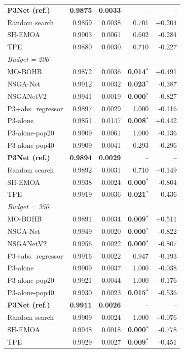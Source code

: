 \begin{table}[t]
\begin{tabular}{@{}lrrrr@{}}
        \textbf{P3Net (ref.)} & \textbf{0.9875} & \textbf{0.0033} & -- & -- \\
        Random search & 0.9859 & 0.0038 & 0.701 & +0.204 \\
        SH-EMOA & 0.9903 & 0.0061 & 0.602 & -0.284 \\
        TPE & 0.9880 & 0.0030 & 0.710 & -0.227 \\
        \midrule
        \multicolumn{5}{l}{\emph{Budget = 200}} \\
        MO-BOHB & 0.9872 & 0.0036 & \textbf{0.014$^{*}$} & +0.491 \\
        NSGA-Net & 0.9912 & 0.0032 & \textbf{0.023$^{*}$} & -0.387 \\
        NSGANetV2 & 0.9941 & 0.0019 & \textbf{0.000$^{*}$} & -0.827 \\
        P3+abs.\ regressor & 0.9897 & 0.0029 & 1.000 & -0.116 \\
        P3-alone & 0.9851 & 0.0147 & \textbf{0.008$^{*}$} & +0.442 \\
        P3-alone-pop20 & 0.9909 & 0.0061 & 1.000 & -0.136 \\
        P3-alone-pop40 & 0.9909 & 0.0041 & 0.293 & -0.296 \\
        \textbf{P3Net (ref.)} & \textbf{0.9894} & \textbf{0.0029} & -- & -- \\
        Random search & 0.9892 & 0.0031 & 0.710 & +0.149 \\
        SH-EMOA & 0.9938 & 0.0024 & \textbf{0.000$^{*}$} & -0.804 \\
        TPE & 0.9919 & 0.0036 & \textbf{0.021$^{*}$} & -0.436 \\
        \midrule
        \multicolumn{5}{l}{\emph{Budget = 350}} \\
        MO-BOHB & 0.9891 & 0.0034 & \textbf{0.009$^{*}$} & +0.511 \\
        NSGA-Net & 0.9949 & 0.0020 & \textbf{0.000$^{*}$} & -0.822 \\
        NSGANetV2 & 0.9956 & 0.0022 & \textbf{0.000$^{*}$} & -0.807 \\
        P3+abs.\ regressor & 0.9916 & 0.0022 & 0.947 & -0.193 \\
        P3-alone & 0.9909 & 0.0037 & 1.000 & -0.038 \\
        P3-alone-pop20 & 0.9921 & 0.0044 & 1.000 & -0.176 \\
        P3-alone-pop40 & 0.9930 & 0.0023 & \textbf{0.015$^{*}$} & -0.536 \\
        \textbf{P3Net (ref.)} & \textbf{0.9911} & \textbf{0.0026} & -- & -- \\
        Random search & 0.9909 & 0.0024 & 1.000 & +0.076 \\
        SH-EMOA & 0.9948 & 0.0018 & \textbf{0.000$^{*}$} & -0.778 \\
        TPE & 0.9929 & 0.0027 & \textbf{0.009$^{*}$} & -0.451 \\
        \bottomrule
    \end{tabular}
\end{table}

